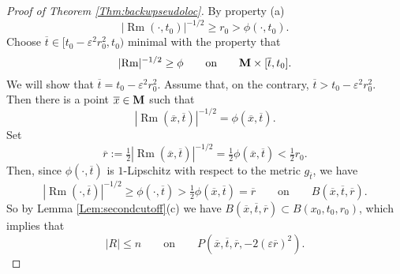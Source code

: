 \documentclass[11pt]{amsart}
\numberwithin{equation}{section}
\def\M{{\bf M}}
\DeclareMathOperator{\Rm}{Rm}
\numberwithin{equation}{section}
\begin{document}
\begin{proof}[Proof of Theorem \ref{Thm:backwpseudoloc}]
By property (a)
\[ |{\Rm} (\cdot, t_0) |^{-1/2} \geq r_0 > \phi (\cdot, t_0). \]
Choose $\overline{t} \in [t_0 - \varepsilon^2 r_0^2, t_0)$ minimal with the property that
\begin{equation} \label{eq:defoftbar}
 |{\Rm}|^{-1/2} \geq \phi \qquad \text{on} \qquad  \M \times [\overline{t}, t_0].
\end{equation}
We will show that $\overline{t} = t_0 -  \varepsilon^2 r_0^2$.
Assume that, on the contrary, $\overline{t} > t_0 -  \varepsilon^2 r_0^2$.
Then there is a point $\overline{x} \in \M$ such that
\begin{equation} \label{eq:defofxbar}
 |{\Rm(\overline{x}, \overline{t})}|^{-1/2} = \phi (\overline{x}, \overline{t}).
\end{equation}
Set
\begin{equation} \label{eq:defofovr}
 \overline{r} := \tfrac12 |{\Rm} (\overline{x}, \overline{t}) |^{-1/2} = \tfrac12 \phi (\overline{x}, \overline{t}) < \tfrac12 r_0.
\end{equation}
Then, since $\phi (\cdot, \overline{t})$ is $1$-Lipschitz with respect to the metric $g_{\overline{t}}$, we have
\begin{equation} \label{eq:subcurvbound}
 |{\Rm(\cdot, \overline{t})}|^{-1/2} \geq \phi (\cdot, \overline{t}) > \tfrac12 \phi (\overline{x}, \overline{t}) = \overline{r} \qquad \text{on} \qquad B(\overline{x}, \overline{t}, \overline{r}).
\end{equation}
So by Lemma \ref{Lem:secondcutoff}(c) we have $B(\overline{x}, \overline{t}, \overline{r}) \subset B(x_0, t_0, r_0)$, which implies that
\begin{equation} \label{eq:subscalbound}
 |R| \leq n  \qquad \text{on} \qquad P(\overline{x}, \overline{t}, \overline{r}, - 2 (\varepsilon \overline{r})^2).
\end{equation}


\end{proof}
\end{document}
